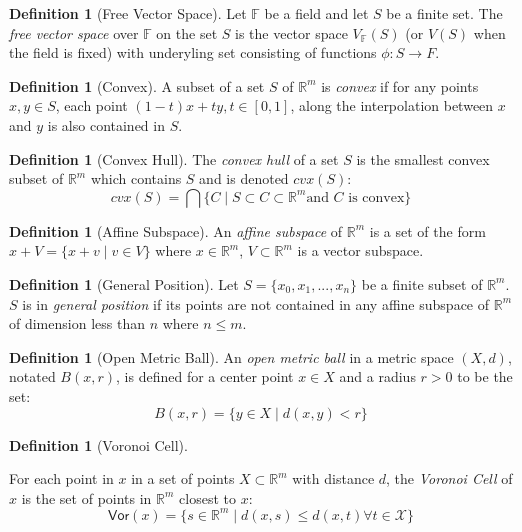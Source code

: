\documentclass[ma]{uncgdissertationexp}
\theoremstyle{plain}
\theoremstyle{definition}
\newtheorem{definition}[theorem]{Definition}
\theoremstyle{remark}
\begin{document}
\begin{definition}[Free Vector Space]
\par Let $\mathbb{F}$ be a field and let $S$ be a finite set. The \textit{free vector space} over $\mathbb{F}$ on the set $S$ is the vector space $V_{\mathbb{F}}(S)$ (or $V(S)$ when the field is fixed) with underyling set consisting of functions $\phi: S \rightarrow F$.
\end{definition}

\begin{definition}[Convex]
\par A subset of a set $S$ of $\mathbb{R}^m$ is \textit{convex} if for any points $x, y \in S$, each point $(1-t)x+ty, t\in [0,1]$, along the interpolation between $x$ and $y$ is also contained in $S$.
\end{definition}

\begin{definition}[Convex Hull]
\par The \textit{convex hull} of a set $S$ is the smallest convex subset of $\mathbb{R}^m$ which contains $S$ and is denoted $cvx(S)$:
$$cvx(S) = \bigcap\{C \mid S\subset C \subset \mathbb{R}^m \text{and } C \text{ is convex}\}$$
\end{definition}

\begin{definition}[Affine Subspace]
\par An \textit{affine subspace} of $\mathbb{R}^m$ is a set of the form
$x+V = \{x + v \mid v\in V\}$ where $x\in\mathbb{R}^m$, $V\subset\mathbb{R}^m$ is a vector subspace.
\end{definition}

\begin{definition}[General Position]
Let $S=\{x_0, x_1, ..., x_n\}$ be a finite subset of $\mathbb{R}^m$. $S$ is in \textit{general position} if its points are not contained in any affine subspace of $\mathbb{R}^m$ of dimension less than $n$ where $n\leq m$.
\end{definition}

\begin{definition}[Open Metric Ball]
\par An \textit{open metric ball} in a metric space $(X, d)$, notated $B(x, r)$, is defined for a center point $x\in X$ and a radius $r>0$ to be the set:
$$B(x,r) = \{y\in X \mid d(x,y)<r\}$$
\end{definition}

\begin{definition}[Voronoi Cell]
\label{def:voronoi}
\par For each point in $x$ in a set of points $X\subset\mathbb{R}^{m}$ with distance $d$, the \textit{Voronoi Cell} of $x$ is the set of points in $\mathbb{R}^{m}$  closest to $x$:
$$\mathsf{Vor}(x) = \{s\in \mathbb{R}^{m} \mid d(x,s) \leq d(x, t) \forall t \in \mathcal{X}\}$$
\end{definition}
\end{document}
